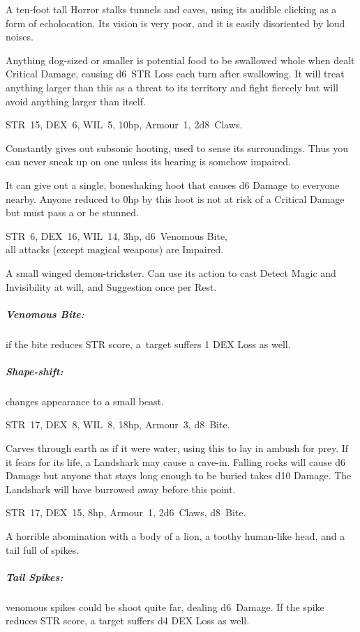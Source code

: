 \documentclass[itdr]{subfiles}
\begin{document}
A ten-foot tall Horror stalks tunnels and caves, using its audible clicking as a form of echolocation. Its vision is very poor, and it is easily disoriented by loud noises.

Anything dog-sized or smaller is potential food to be swallowed whole when dealt Critical Damage, causing d6~STR Loss each turn after swallowing. It will treat anything larger than this as a threat to its territory and fight fiercely but will avoid anything larger than itself.

\vfill

STR~15, DEX~6, WIL~5, 10hp, Armour~1, 2d8~Claws.

Constantly gives out subsonic hooting, used to sense its surroundings. Thus you can never sneak up on one unless its hearing is somehow impaired.

It can give out a single, boneshaking hoot that causes d6 Damage to everyone nearby. Anyone reduced to 0hp by this hoot is not at risk of a Critical Damage but must pass a  or be stunned.

\vfill

STR~6, DEX~16, WIL~14, 3hp, d6~Venomous Bite,\\all attacks (except magical weapons) are Impaired.

A small winged demon-trickster. Can use its action to cast Detect Magic and Invisibility at will, and Suggestion once per Rest.

\subparagraph{Venomous Bite:} if the bite reduces STR score, \mbox{a target} suffers 1 DEX Loss as well.

\subparagraph{Shape-shift:} changes appearance to a small beast.

\vfill
\break

STR~17, DEX~8, WIL~8, 18hp, Armour~3, d8~Bite.

Carves through earth as if it were water, using this to lay in ambush for prey. If it fears for its life, a Landshark may cause a cave-in. Falling rocks will cause d6 Damage but anyone that stays long enough to be buried takes d10 Damage. The Landshark will have burrowed away before this point.

\vfill

STR~17, DEX~15, 8hp, Armour~1, 2d6~Claws, d8~Bite.

A horrible abomination with a body of a lion, a toothy human-like head, and a tail full of spikes.

\subparagraph{Tail Spikes:} venomous spikes could be shoot quite far, dealing d6~Damage. If the spike reduces STR score, a target suffers d4 DEX Loss as well.
\end{document}
